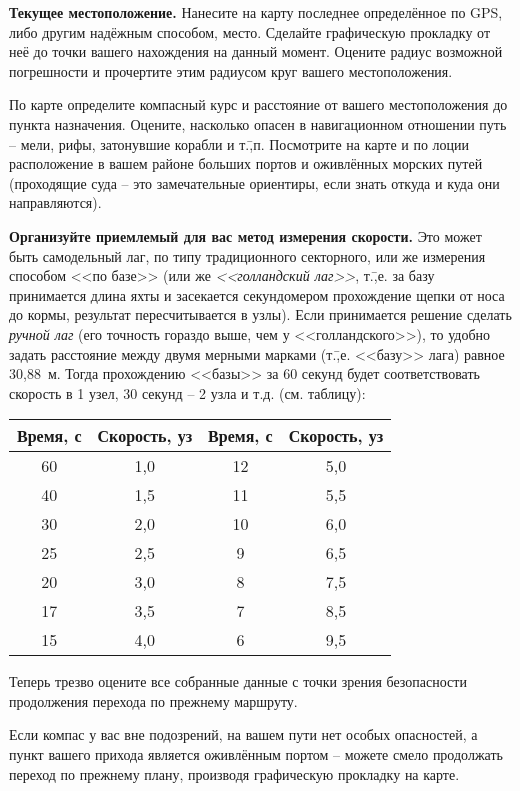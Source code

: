 \textbf{Текущее местоположение.} Нанесите на карту последнее
определённое по GPS, либо другим надёжным способом, место. Сделайте
графическую прокладку от неё до точки вашего нахождения на данный
момент. Оцените радиус возможной погрешности и прочертите этим
радиусом круг вашего местоположения.

По карте определите компасный курс и расстояние от вашего
местоположения до пункта назначения. Оцените, насколько опасен в
навигационном отношении путь \--- мели, рифы, затонувшие корабли и
т.\=,п. Посмотрите на карте и по лоции расположение в вашем районе
больших портов и оживлённых морских путей (проходящие суда \--- это
замечательные ориентиры, если знать откуда и куда они направляются).

\textbf{Организуйте приемлемый для вас метод измерения скорости.} Это
может быть самодельный лаг, по типу традиционного секторного, или же
измерения способом <<по базе>> (или же
\textit{<<голландский лаг>>}, т.\=,е. за
базу принимается длина яхты и засекается секундомером прохождение
щепки от носа до кормы, результат пересчитывается в узлы). Если
принимается решение сделать \textit{ручной лаг} (его точность гораздо выше, чем
у <<голландского>>), то удобно задать расстояние между двумя мерными
марками (т.\=,е. <<базу>> лага) равное 30,88~м. Тогда прохождению
<<базы>> за 60 секунд будет соответствовать скорость в 1 узел, 30
секунд \--- 2 узла и т.д. (см. таблицу):

\begin{longtable}{c|c||c|c}
  \toprule
  Время, с & Скорость, уз & Время, с & Скорость, уз \\
  \midrule
  60 & 1,0 & 12 & 5,0 \\
  40 & 1,5 & 11 & 5,5 \\
  30 & 2,0 & 10 & 6,0 \\
  25 & 2,5 & 9  & 6,5 \\
  20 & 3,0 & 8  & 7,5 \\
  17 & 3,5 & 7  & 8,5 \\
  15 & 4,0 & 6  & 9,5 \\
  \bottomrule
\end{longtable}

Теперь трезво оцените все собранные данные с точки зрения безопасности
продолжения перехода по прежнему маршруту.

Если компас у вас вне подозрений, на вашем пути нет особых опасностей,
а пункт вашего прихода является оживлённым портом \--- можете смело
продолжать переход по прежнему плану, производя графическую прокладку
на карте.

